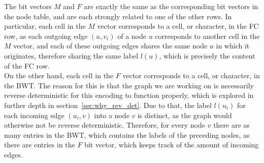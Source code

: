 \documentclass[a4paper,12pt,twoside,BCOR=10mm]{scrbook}
\begin{document}
The bit vectors $ M $ and $ F $ are exactly the same as the corresponding bit vectors in the node table, 
and are each strongly related to one of the other rows. 
In particular, each cell in the $ M $ vector corresponds to a cell, or character, in the FC row, 
as each outgoing edge $ (u, v_i) $ of a node $ u $ corresponds to another cell in the $ M $ vector, and each 
of these outgoing edges shares the same node $ u $ in which it originates, therefore sharing the same label $ l ( u ) $, 
which is precisely the content of the FC row. \\
On the other hand, each cell in the $ F $ vector corresponds to a cell, or character, in the BWT. 
The reason for this is that the graph we are working on is necessarily reverse deterministic 
for this encoding to function properly, which is explored in further depth in section~\ref{sec:why_rev_det}. 
Due to that, the label $ l (u_i) $ for each incoming edge $ (u_i, v) $ into a node $ v $ is distinct, 
as the graph would otherwise not be reverse deterministic. 
Therefore, for every node $ v $ there are as many entries in the BWT, which contains the labels of the preceding nodes, 
as there are entries in the $ F $ bit vector, which keeps track of the amount of incoming edges.
\end{document}
